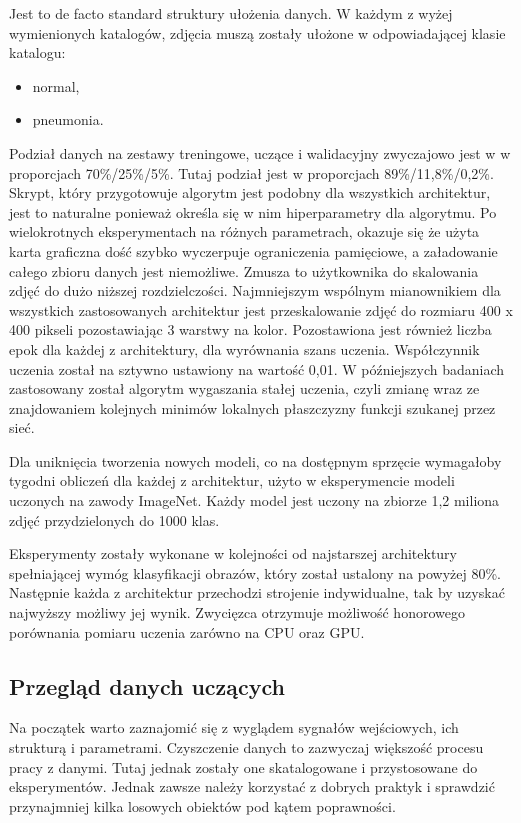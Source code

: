 \documentclass[12pt,a4paper,twoside,titlepage,openright]{book}
\begin{document}
Jest to de facto standard struktury ułożenia danych. W każdym z wyżej wymienionych katalogów, zdjęcia muszą zostały ułożone w odpowiadającej klasie katalogu:
\begin{itemize}
\item normal,
\item pneumonia.
\end{itemize}

Podział danych na zestawy treningowe, uczące i walidacyjny zwyczajowo jest w w proporcjach 70\%/25\%/5\%. Tutaj podział jest w proporcjach 89\%/11,8\%/0,2\%.
Skrypt, który przygotowuje algorytm jest podobny dla wszystkich architektur, jest to naturalne ponieważ określa się w nim hiperparametry dla algorytmu. Po wielokrotnych eksperymentach na różnych parametrach, okazuje się że użyta karta graficzna dość szybko wyczerpuje ograniczenia pamięciowe, a załadowanie całego zbioru danych jest niemożliwe. Zmusza to użytkownika do skalowania zdjęć do dużo niższej rozdzielczości. Najmniejszym wspólnym mianownikiem dla wszystkich zastosowanych architektur jest przeskalowanie zdjęć do rozmiaru 400 x 400 pikseli pozostawiając 3 warstwy na kolor. Pozostawiona jest również liczba epok dla każdej z architektury, dla wyrównania szans uczenia. Współczynnik uczenia został na sztywno ustawiony na wartość 0,01. W późniejszych badaniach zastosowany został algorytm wygaszania stałej uczenia, czyli zmianę wraz ze znajdowaniem kolejnych minimów lokalnych płaszczyzny funkcji szukanej przez sieć.

Dla uniknięcia tworzenia nowych modeli, co na dostępnym sprzęcie wymagałoby tygodni obliczeń dla każdej z architektur, użyto w eksperymencie modeli uczonych na zawody ImageNet. Każdy model jest uczony na zbiorze 1,2 miliona zdjęć przydzielonych do 1000 klas. 

Eksperymenty zostały wykonane w kolejności od najstarszej architektury spełniającej wymóg klasyfikacji obrazów, który został ustalony na powyżej 80\%. Następnie każda z architektur przechodzi strojenie indywidualne, tak by uzyskać najwyższy możliwy jej wynik. Zwycięzca otrzymuje możliwość honorowego porównania pomiaru uczenia zarówno na CPU oraz GPU.

\subsection{Przegląd danych uczących}
Na początek warto zaznajomić się z wyglądem sygnałów wejściowych, ich strukturą i parametrami. Czyszczenie danych to zazwyczaj większość procesu pracy z danymi. Tutaj jednak zostały one skatalogowane i przystosowane do eksperymentów. Jednak zawsze należy korzystać z dobrych praktyk i sprawdzić przynajmniej kilka losowych obiektów pod kątem poprawności.
\end{document}
